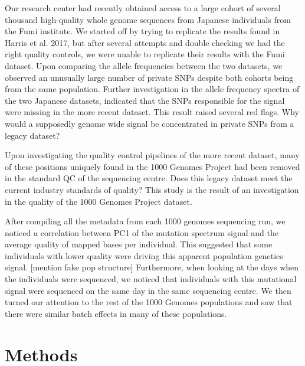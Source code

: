 \documentclass[12pt]{amsart}
\begin{document}
Our research center had recently obtained access to a large cohort of several thousand high-quality whole genome sequences from Japanese individuals from the Fumi institute. 
We started off by trying to replicate the results found in Harris et al. 2017, but after several attempts and double checking we had the right quality controls, we were unable to replicate their results with the Fumi dataset. 
Upon comparing the allele frequencies between the two datasets, we observed an unusually large number of private SNPs despite both cohorts being from the same population. 
Further investigation in the allele frequency spectra of the two Japanese datasets, indicated that the SNPs responsible for the signal were missing in the more recent dataset. 
This result raised several red flags. 
Why would a supposedly genome wide signal be concentrated in private SNPs from a legacy dataset?


Upon investigating the quality control pipelines of the more recent dataset, many of these positions uniquely found in the 1000 Genomes Project had been removed in the standard QC of the sequencing centre. 
Does this legacy dataset meet the current industry standards of quality? 
This study is the result of an investigation in the quality of the 1000 Genomes Project dataset. 


After compiling all the metadata from each 1000 genomes sequencing run, we noticed a correlation between PC1 of the mutation spectrum signal and the average quality of mapped bases per individual. 
This suggested that some individuals with lower quality were driving this apparent population genetics signal. [mention fake pop structure]
Furthermore, when looking at the days when the individuals were sequenced, we noticed that individuals with this mutational signal were sequenced on the same day in the same sequencing centre.
We then turned our attention to the rest of the 1000 Genomes populations and saw that there were similar batch effects in many of these populations.

			\section{Methods}
\end{document}
